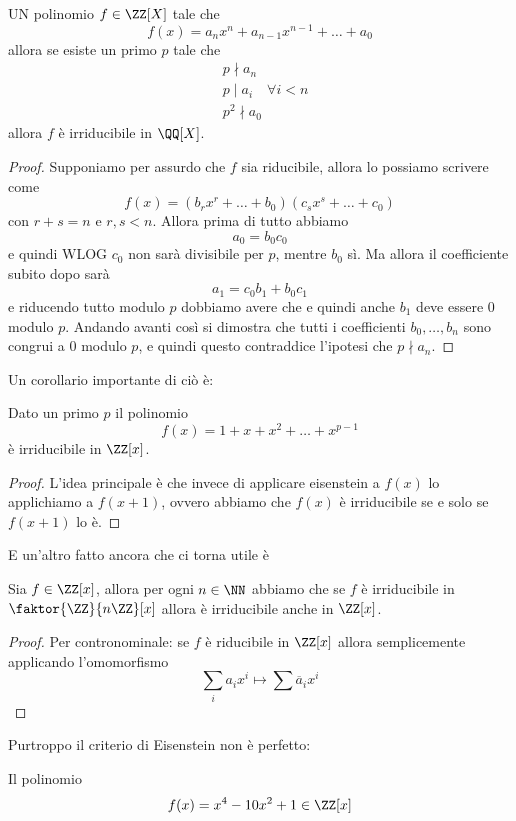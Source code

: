 \documentclass[11pt]{scrartcl}
\begin{document}
	\begin{theorem}
		UN polinomio $f\in \ZZ[X]$ tale che
		$$f(x)=a_nx^n+a_{n-1}x^{n-1}+\dots+a_0$$
		allora se esiste un primo $p$ tale che
		\begin{align*}
			& p \nmid a_n\\
			& p \mid a_i \quad\forall i<n \\
			& p^2\nmid a_0
		\end{align*}
		allora $f$ è irriducibile in $\QQ[X]$.
	\end{theorem}
	\begin{proof}
		Supponiamo per assurdo che $f$ sia riducibile, allora lo possiamo scrivere come
		$$f(x)=(b_rx^r+\dots +b_0)\left(c_sx^s+\dots+c_0\right)$$
		con $r+s=n$ e $r,s<n$. Allora prima di tutto abbiamo 
		$$a_0=b_0c_0$$
		e quindi WLOG $c_0$ non sarà divisibile per $p$, mentre $b_0$ sì. Ma allora il coefficiente subito dopo sarà
		$$a_1=c_0b_1+b_0c_1$$
		e riducendo tutto modulo $p$ dobbiamo avere che e quindi anche $b_1$ deve essere $0$ modulo $p$. Andando avanti così si dimostra che tutti i coefficienti $b_0,\dots,b_n$ sono congrui a $0$ modulo $p$, e quindi questo contraddice l'ipotesi che $p\nmid a_n$. 
	\end{proof}
	Un corollario importante di ciò è:
	\begin{proposition}
		Dato un primo $p$ il polinomio 
		$$f(x)=1+x+x^2+\dots+x^{p-1}$$
		è irriducibile in $\ZZ[x]$.
	\end{proposition}
	\begin{proof}
		L'idea principale è che invece di applicare eisenstein a $f(x)$ lo applichiamo a $f(x+1)$, ovvero abbiamo che $f(x)$ è irriducibile se e solo se $f(x+1)$ lo è.
	\end{proof}
	E un'altro fatto ancora che ci torna utile è
	\begin{proposition}
		Sia $f\in \ZZ[x]$, allora per ogni $n\in\NN$ abbiamo che se $f$ è irriducibile in $\faktor{\ZZ}{n\ZZ}[x]$ allora è irriducibile anche in $\ZZ[x]$.
	\end{proposition}
	\begin{proof}
		Per contronominale: se $f$ è riducibile in $\ZZ[x]$ allora semplicemente applicando l'omomorfismo
		$$\sum_i a_ix^i \mapsto \sum \overline{a}_ix^i$$
	\end{proof}
	Purtroppo il criterio di Eisenstein non è perfetto:
	\begin{example}
		Il polinomio
		$$f(x)=x^4-10x^2+1\in \ZZ[x]$$
	\end{example}
	
\end{document}
